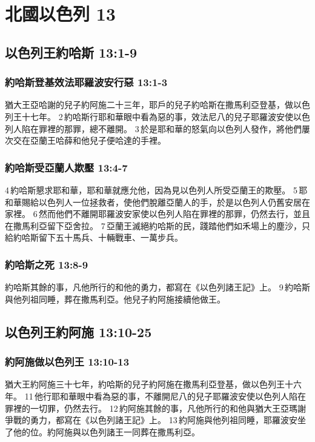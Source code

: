 \section{北國以色列 13 }
\subsection{以色列王約哈斯 13:1-9}
\subsubsection{約哈斯登基效法耶羅波安行惡 13:1-3 }
猶大王亞哈謝的兒子約阿施二十三年，耶戶的兒子約哈斯在撒馬利亞登基，做以色列王十七年。 2 約哈斯行耶和華眼中看為惡的事，效法尼八的兒子耶羅波安使以色列人陷在罪裡的那罪，總不離開。 3 於是耶和華的怒氣向以色列人發作，將他們屢次交在亞蘭王哈薛和他兒子便哈達的手裡。 

\subsubsection{約哈斯受亞蘭人欺壓 13:4-7 }
4 約哈斯懇求耶和華，耶和華就應允他，因為見以色列人所受亞蘭王的欺壓。 5 耶和華賜給以色列人一位拯救者，使他們脫離亞蘭人的手，於是以色列人仍舊安居在家裡。 6 然而他們不離開耶羅波安家使以色列人陷在罪裡的那罪，仍然去行，並且在撒馬利亞留下亞舍拉。 7 亞蘭王滅絕約哈斯的民，踐踏他們如禾場上的塵沙，只給約哈斯留下五十馬兵、十輛戰車、一萬步兵。 

\subsubsection{約哈斯之死 13:8-9 }
約哈斯其餘的事，凡他所行的和他的勇力，都寫在《以色列諸王記》上。 9 約哈斯與他列祖同睡，葬在撒馬利亞。他兒子約阿施接續他做王。

\subsection{以色列王約阿施 13:10-25}
\subsubsection{約阿施做以色列王 13:10-13 }
猶大王約阿施三十七年，約哈斯的兒子約阿施在撒馬利亞登基，做以色列王十六年。 11 他行耶和華眼中看為惡的事，不離開尼八的兒子耶羅波安使以色列人陷在罪裡的一切罪，仍然去行。 12 約阿施其餘的事，凡他所行的和他與猶大王亞瑪謝爭戰的勇力，都寫在《以色列諸王記》上。 13 約阿施與他列祖同睡，耶羅波安坐了他的位。約阿施與以色列諸王一同葬在撒馬利亞。

